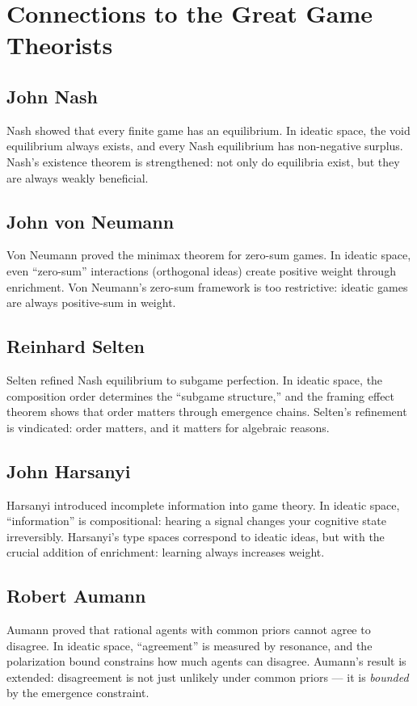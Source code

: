 \section{Connections to the Great Game Theorists}

\subsection*{John Nash}
Nash showed that every finite game has an equilibrium. In ideatic space, the void equilibrium always exists, and every Nash equilibrium has non-negative surplus. Nash's existence theorem is strengthened: not only do equilibria exist, but they are always weakly beneficial.

\subsection*{John von Neumann}
Von Neumann proved the minimax theorem for zero-sum games. In ideatic space, even ``zero-sum'' interactions (orthogonal ideas) create positive weight through enrichment. Von Neumann's zero-sum framework is too restrictive: ideatic games are always positive-sum in weight.

\subsection*{Reinhard Selten}
Selten refined Nash equilibrium to subgame perfection. In ideatic space, the composition order determines the ``subgame structure,'' and the framing effect theorem shows that order matters through emergence chains. Selten's refinement is vindicated: order matters, and it matters for algebraic reasons.

\subsection*{John Harsanyi}
Harsanyi introduced incomplete information into game theory. In ideatic space, ``information'' is compositional: hearing a signal changes your cognitive state irreversibly. Harsanyi's type spaces correspond to ideatic ideas, but with the crucial addition of enrichment: learning always increases weight.

\subsection*{Robert Aumann}
Aumann proved that rational agents with common priors cannot agree to disagree. In ideatic space, ``agreement'' is measured by resonance, and the polarization bound constrains how much agents can disagree. Aumann's result is extended: disagreement is not just unlikely under common priors --- it is \emph{bounded} by the emergence constraint.

